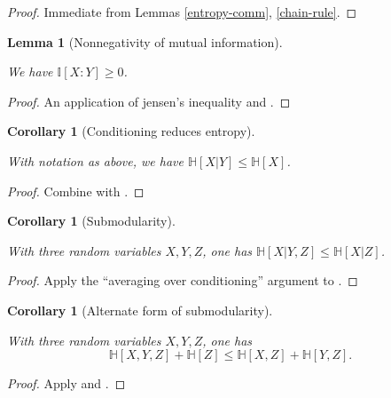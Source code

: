 \documentclass[10pt,a4paper]{article}
\newtheorem{lemma}[theorem]{Lemma}
\newtheorem{corollary}[theorem]{Corollary}
\newcommand{\lean}[1]{}
\newcommand{\uses}[1]{}
\newcommand{\leanok}{}
\newcommand{\bbH}{\mathbb{H}}
\newcommand{\bbI}{\mathbb{I}}
\begin{document}
\begin{proof}
  \uses{entropy-comm,chain-rule}
  \leanok
  Immediate from Lemmas \ref{entropy-comm}, \ref{chain-rule}.
\end{proof}

\begin{lemma}[Nonnegativity of mutual information]
  \label{mutual-nonneg}
  \lean{ProbabilityTheory.mutualInfo_nonneg}
  \leanok
  We have $\bbI[X:Y] \geq 0$.
\end{lemma}

\begin{proof}
  \uses{concave, alternative-mutual}
  \leanok

  An application of jensen's inequality and .
\end{proof}


\begin{corollary}[Conditioning reduces entropy]
  \label{cond-reduce}
  \lean{ProbabilityTheory.condEntropy_le_entropy}
  \leanok
  With notation as above, we have $\bbH[X|Y] \leq \bbH[X]$.
\end{corollary}
\begin{proof}
  \uses{mutual-nonneg, alternative-mutual}
  \leanok
  Combine  with .
\end{proof}

\begin{corollary}[Submodularity]\label{submodularity}
  \lean{ProbabilityTheory.entropy_submodular, ProbabilityTheory.condEntropy_comp_ge}\leanok
  With three random variables $X,Y,Z$, one has $\bbH[X|Y,Z] \leq \bbH[X|Z]$.
\end{corollary}

\begin{proof} \uses{cond-reduce}\leanok Apply the ``averaging over conditioning'' argument to .
\end{proof}

\begin{corollary}[Alternate form of submodularity]\label{alt-submodularity}
  \lean{ProbabilityTheory.entropy_triple_add_entropy_le}\leanok
  With three random variables $X,Y,Z$, one has
  $$ \bbH[X,Y,Z] + \bbH[Z] \leq \bbH[X,Z] + \bbH[Y,Z].$$
\end{corollary}

\begin{proof}  \uses{submodularity,chain-rule} \leanok Apply  and .
\end{proof}
\end{document}
